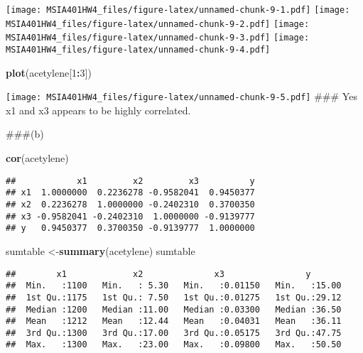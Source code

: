 \documentclass[
]{article}
\newenvironment{Shaded}{\begin{snugshade}}{\end{snugshade}}
\newcommand{\DecValTok}[1]{\textcolor[rgb]{0.00,0.00,0.81}{#1}}
\newcommand{\KeywordTok}[1]{\textcolor[rgb]{0.13,0.29,0.53}{\textbf{#1}}}
\newcommand{\NormalTok}[1]{#1}
\newcommand{\OperatorTok}[1]{\textcolor[rgb]{0.81,0.36,0.00}{\textbf{#1}}}
\begin{document}
\texttt{[image: MSIA401HW4\_files/figure-latex/unnamed-chunk-9-1.pdf]}
\texttt{[image: MSIA401HW4\_files/figure-latex/unnamed-chunk-9-2.pdf]}
\texttt{[image: MSIA401HW4\_files/figure-latex/unnamed-chunk-9-3.pdf]}
\texttt{[image: MSIA401HW4\_files/figure-latex/unnamed-chunk-9-4.pdf]}

\begin{Shaded}
\begin{Highlighting}[]
\KeywordTok{plot}\NormalTok{(acetylene[}\DecValTok{1}\OperatorTok{:}\DecValTok{3}\NormalTok{])}
\end{Highlighting}
\end{Shaded}

\texttt{[image: MSIA401HW4\_files/figure-latex/unnamed-chunk-9-5.pdf]}
\#\#\# Yes x1 and x3 appears to be highly correlated.

\#\#\#(b)

\begin{Shaded}
\begin{Highlighting}[]
\KeywordTok{cor}\NormalTok{(acetylene)}
\end{Highlighting}
\end{Shaded}

\begin{verbatim}
##            x1         x2         x3          y
## x1  1.0000000  0.2236278 -0.9582041  0.9450377
## x2  0.2236278  1.0000000 -0.2402310  0.3700350
## x3 -0.9582041 -0.2402310  1.0000000 -0.9139777
## y   0.9450377  0.3700350 -0.9139777  1.0000000
\end{verbatim}

\begin{Shaded}
\begin{Highlighting}[]
\NormalTok{sumtable <-}\KeywordTok{summary}\NormalTok{(acetylene)}
\NormalTok{sumtable}
\end{Highlighting}
\end{Shaded}

\begin{verbatim}
##        x1             x2              x3                y        
##  Min.   :1100   Min.   : 5.30   Min.   :0.01150   Min.   :15.00  
##  1st Qu.:1175   1st Qu.: 7.50   1st Qu.:0.01275   1st Qu.:29.12  
##  Median :1200   Median :11.00   Median :0.03300   Median :36.50  
##  Mean   :1212   Mean   :12.44   Mean   :0.04031   Mean   :36.11  
##  3rd Qu.:1300   3rd Qu.:17.00   3rd Qu.:0.05175   3rd Qu.:47.75  
##  Max.   :1300   Max.   :23.00   Max.   :0.09800   Max.   :50.50
\end{verbatim}
\end{document}
